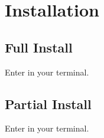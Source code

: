\documentclass[letterpaper,10pt,english]{sphinxmanual}
\begin{document}
\chapter{Installation}
\label{\detokenize{Installation:installation}}\label{\detokenize{Installation::doc}}

\section{Full Install}
\label{\detokenize{Installation:full-install}}
\sphinxAtStartPar
Enter  in your terminal.


\section{Partial Install}
\label{\detokenize{Installation:partial-install}}
\sphinxAtStartPar
Enter  in your terminal.

\sphinxstepscope
\end{document}
